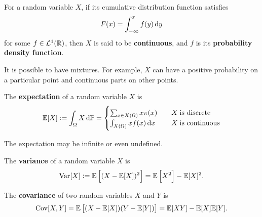 \begin{definition} 
    For a random variable $X$, if its cumulative distribution function satisfies
    \begin{equation*}
        F(x) = \int_{-\infty}^x f(y) \dif y
    \end{equation*}
    for some $f \in \mathcal{L}^1(\mathbb{R})$, then $X$ is said to be \textbf{continuous}, and $f$ is its \textbf{probability density function}.
\end{definition}

\begin{remark}
    It is possible to have mixtures. For example, $X$ can have a positive probability on a particular point and continuous parts on other points.
\end{remark}

\begin{definition}[Expectation]
    The \textbf{expectation} of a random variable $X$ is
    \begin{equation*}
        \E [X] := \int_{\Omega} X \dif \prob = \begin{cases}
            \sum_{x \in X(\Omega)} x \pi (x) & \quad X \; \text{is discrete} \\ 
            \int_{X(\Omega)} x f(x) \dif x & \quad X \; \text{is continuous}
        \end{cases}
    \end{equation*}
\end{definition}

\begin{remark}
    The expectation may be infinite or even undefined.
\end{remark}

\begin{definition}[Variance]
    The \textbf{variance} of a random variable $X$ is 
    \begin{equation*}
        \mathrm{Var} [X] := \mathbb{E} \left[ (X - \mathbb{E} [X])^2 \right] = \mathbb{E} \left[X^2\right] - \mathbb{E} [X]^2.
    \end{equation*}
\end{definition}

\begin{definition}[Covariance]
    The \textbf{covariance} of two random variables $X$ and $Y$ is
    \begin{equation*}
        \mathrm{Cov} [X, Y] = \mathbb{E} \left[(X - \mathbb{E} [X])(Y - \mathbb{E} [Y])\right] = \mathbb{E} [XY] - \mathbb{E}[X]\mathbb{E}[Y].
    \end{equation*}
\end{definition}

